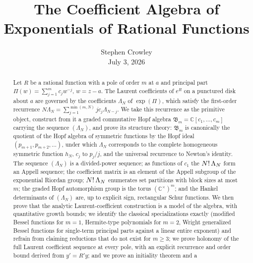 \documentclass{article}
\newcommand{\tmaffiliation}[1]{\\ #1}
\newcommand{\CA}{\mathfrak{B}}
\newcommand{\C}{\mathbb{C}}
\begin{document}
\title{The Coefficient Algebra of Exponentials of Rational Functions}

\author{
  Stephen Crowley
  \tmaffiliation{July 3, 2026}
}

\date{}

\maketitle

\begin{abstract}
  Let $R$ be a rational function with a pole of order $m$ at $a$ and principal
  part $\Pi (w) = \sum_{j = 1}^m c_j w^{- j}$, $w = z - a$. The Laurent
  coefficients of $e^R$ on a punctured disk about $a$ are governed by the
  coefficients $\Lambda_N$ of $\exp (\Pi)$, which satisfy the first-order
  recurrence $N \Lambda_N = \sum_{j = 1}^{\min (m, N)} jc_j \Lambda_{N - j}$.
  We take this recurrence as the primitive object, construct from it a graded
  commutative Hopf algebra $\CA_m = \C [c_1, \ldots, c_m]$ carrying the
  sequence $(\Lambda_N)$, and prove its structure theory: $\CA_m$ is
  canonically the quotient of the Hopf algebra of symmetric functions by the
  Hopf ideal $(p_{m + 1}, p_{m + 2}, \ldots)$, under which $\Lambda_N$
  corresponds to the complete homogeneous symmetric function $h_N$, $c_j$ to
  $p_j / j$, and the universal recurrence to Newton's identity. The sequence
  $(\Lambda_N)$ is a divided-power sequence; as functions of $c_1$ the $N!
  \hspace{0.17em} \Lambda_N$ form an Appell sequence; the coefficient matrix
  is an element of the Appell subgroup of the exponential Riordan group; $N!
  \hspace{0.17em} \Lambda_N$ enumerates set partitions with block sizes at
  most $m$; the graded Hopf automorphism group is the torus $(\C^{\times})^m$;
  and the Hankel determinants of $(\Lambda_N)$ are, up to explicit sign,
  rectangular Schur functions. We then prove that the analytic
  Laurent-coefficient construction is a model of the algebra, with
  quantitative growth bounds; we identify the classical specializations
  exactly (modified Bessel functions for $m = 1$, Hermite-type polynomials for
  $m = 2$, Wright generalized Bessel functions for single-term principal parts
  against a linear entire exponent) and refrain from claiming reductions that
  do not exist for $m \ge 3$; we prove holonomy of the full Laurent
  coefficient sequence at every pole, with an explicit recurrence and order
  bound derived from $y' = R' y$; and we prove an initiality theorem and a

\end{abstract}
\end{document}
